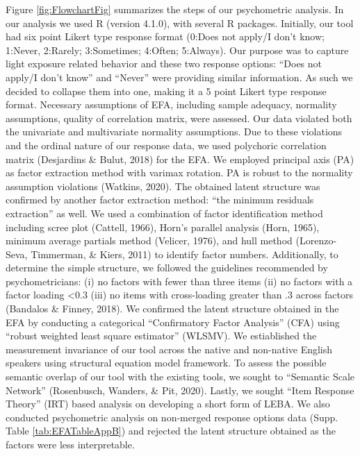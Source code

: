 \documentclass[
  english,
  man]{apa6}
\begin{document}
Figure \ref{fig:FlowchartFig} summarizes the steps of our psychometric analysis. In our analysis we used R (version 4.1.0), with several R packages. Initially, our tool had six point Likert type response format (0:Does not apply/I don't know; 1:Never, 2:Rarely; 3:Sometimes; 4:Often; 5:Always). Our purpose was to capture light exposure related behavior and these two response options: ``Does not apply/I don't know'' and ``Never'' were providing similar information. As such we decided to collapse them into one, making it a 5 point Likert type response format. Necessary assumptions of EFA, including sample adequacy, normality assumptions, quality of correlation matrix, were assessed. Our data violated both the univariate and multivariate normality assumptions. Due to these violations and the ordinal nature of our response data, we used polychoric correlation matrix (Desjardins \& Bulut, 2018) for the EFA. We employed principal axis (PA) as factor extraction method with varimax rotation. PA is robust to the normality assumption violations (Watkins, 2020). The obtained latent structure was confirmed by another factor extraction method: ``the minimum residuals extraction'' as well. We used a combination of factor identification method including scree plot (Cattell, 1966), Horn's parallel analysis (Horn, 1965), minimum average partials method (Velicer, 1976), and hull method (Lorenzo-Seva, Timmerman, \& Kiers, 2011) to identify factor numbers. Additionally, to determine the simple structure, we followed the guidelines recommended by psychometricians: (i) no factors with fewer than three items (ii) no factors with a factor loading \textless0.3 (iii) no items with cross-loading greater than .3 across factors (Bandalos \& Finney, 2018). We confirmed the latent structure obtained in the EFA by conducting a categorical ``Confirmatory Factor Analysis'' (CFA) using ``robust weighted least square estimator'' (WLSMV). We estiablished the measurement invariance of our tool across the native and non-native English speakers using structural equation model framework. To assess the possible semantic overlap of our tool with the existing tools, we sought to ``Semantic Scale Network'' (Rosenbusch, Wanders, \& Pit, 2020). Lastly, we sought ``Item Response Theory'' (IRT) based analysis on developing a short form of LEBA.
We also conducted psychometric analysis on non-merged response options data (Supp. Table \ref{tab:EFATableAppB}) and rejected the latent structure obtained as the factors were less interpretable.
\end{document}
